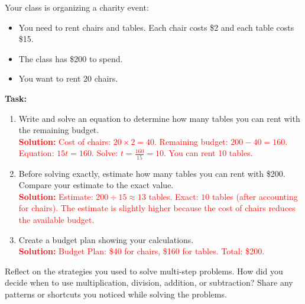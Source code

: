 \documentclass[12pt]{article}
\begin{document}
\begin{tcolorbox}[colframe=black!60, colback=white, 
coltitle=black, colbacktitle=black!15, fonttitle=\bfseries\Large, 
title=Performance Task: Organizing a Charity Event, halign title=center, left=10pt, right=10pt, top=10pt, bottom=50pt]
Your class is organizing a charity event:
\begin{itemize}
    \item You need to rent chairs and tables. Each chair costs \$2 and each table costs \$15.
    \item The class has \$200 to spend.
    \item You want to rent 20 chairs.
\end{itemize}
\textbf{Task:}
\begin{enumerate}[itemsep=3em]
    \item Write and solve an equation to determine how many tables you can rent with the remaining budget.\\
    \textcolor{red}{\textbf{Solution:} Cost of chairs: \( 20 \times 2 = 40 \). Remaining budget: \( 200 - 40 = 160 \). Equation: \( 15t = 160 \). Solve: \( t = \frac{160}{15} = 10 \). You can rent 10 tables.}

    \item Before solving exactly, estimate how many tables you can rent with \$200. Compare your estimate to the exact value.\\
    \textcolor{red}{\textbf{Solution:} Estimate: \( 200 \div 15 \approx 13 \) tables. Exact: \( 10 \) tables (after accounting for chairs). The estimate is slightly higher because the cost of chairs reduces the available budget.}

    \item Create a budget plan showing your calculations.\\
    \textcolor{red}{\textbf{Solution:} Budget Plan: \$40 for chairs, \$160 for tables. Total: \$200.}
\end{enumerate}
\end{tcolorbox}

\vspace{1em}

\begin{tcolorbox}[colframe=black!60, colback=white, 
coltitle=black, colbacktitle=black!15, fonttitle=\bfseries\Large, 
title=Reflection, halign title=center, left=10pt, right=10pt, top=10pt, bottom=100pt]
Reflect on the strategies you used to solve multi-step problems. How did you decide when to use multiplication, division, addition, or subtraction?  Share any patterns or shortcuts you noticed while solving the problems.
\end{tcolorbox}
\end{document}
